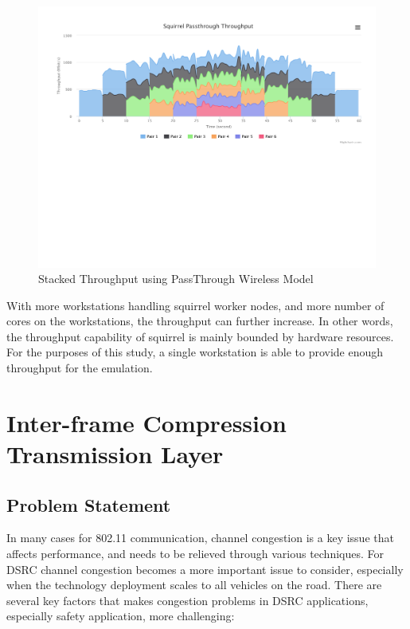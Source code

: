 \documentclass[12pt]{report}
\begin{document}
\begin{figure}[h]
  \includegraphics[width=\textwidth]{figures/results/passthrough.pdf}
  \caption{\label{fig:passthrough}Stacked Throughput using PassThrough Wireless Model}
\end{figure}

With more workstations handling squirrel worker nodes, and more number of cores on the workstations, the throughput can further increase. In other words, the throughput capability of squirrel is mainly bounded by hardware resources. For the purposes of this study, a single workstation is able to provide enough throughput for the emulation.

\chapter{Inter-frame Compression Transmission Layer}

\section{Problem Statement}
\label{sec:problem_congestion}

In many cases for 802.11 communication, channel congestion is a key issue that affects performance, and needs to be relieved through various techniques. For DSRC channel congestion becomes a more important issue to consider, especially when the technology deployment scales to all vehicles on the road. There are several key factors that makes congestion problems in DSRC applications, especially safety application, more challenging:
\end{document}
